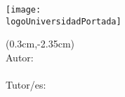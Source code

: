 \begin{titlepage}
\begin{flushright}
    \texttt{[image: \\logoUniversidadPortada]}
\end{flushright}
\begin{textblock*}{\textwidth}(0.3cm,-2.35cm)%
\noindent {\FuentePortada \fontsize{\TamTrabajo}{45pt}\selectfont\color{white}\tipotrabajo}
\\[\TamTrabajoIn] 
{\FuentePortada \fontsize{\TamOtros}{30pt}\selectfont\color{white} Autor:}
\\[\TamOtrosIn]
{\FuentePortada \fontsize{\TamOtros}{50pt}\selectfont\color{white}\miNombre}
\\[\TamOtrosIn]
{\FuentePortada \fontsize{\TamOtros}{30pt}\selectfont\color{white} Tutor/es:}
\\[\TamOtrosIn]
{\FuentePortada \fontsize{\TamOtros}{30pt}\selectfont\color{white}\miTutor}
\\[\TamOtrosIn]
\ifx\miTutorB\undefined \else {\FuentePortada \fontsize{\TamOtros}{30pt}\selectfont\color{white}\miTutorB} \fi
\\[\TamOtrosIn]\\[\TamOtrosIn]		
{\FuentePortada \fontsize{\TamOtros}{30pt}\selectfont\color{white}\Hoy}
\end{textblock*}


\end{titlepage}

\pagecolor{white}






